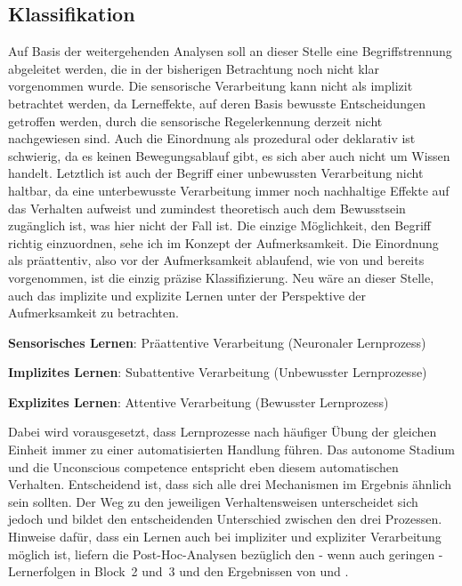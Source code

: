 \documentclass[doc,a4paper,12pt]{apa6}
\begin{document}
\subsection{Klassifikation}

Auf Basis der weitergehenden Analysen soll an dieser Stelle eine Begriffstrennung abgeleitet werden, die in der bisherigen Betrachtung noch nicht klar vorgenommen wurde. Die sensorische Verarbeitung kann nicht als implizit betrachtet werden, da Lerneffekte, auf deren Basis bewusste Entscheidungen getroffen werden, durch die sensorische Regelerkennung derzeit nicht nachgewiesen sind. Auch die Einordnung als prozedural oder deklarativ ist schwierig, da es keinen Bewegungsablauf gibt, es sich aber auch nicht um Wissen handelt. Letztlich ist auch der Begriff einer unbewussten Verarbeitung nicht haltbar, da eine unterbewusste Verarbeitung immer noch nachhaltige Effekte auf das Verhalten aufweist und zumindest theoretisch auch dem Bewusstsein zugänglich ist, was hier nicht der Fall ist. Die einzige Möglichkeit, den Begriff richtig einzuordnen, sehe ich im Konzept der Aufmerksamkeit. Die Einordnung als präattentiv, also vor der Aufmerksamkeit ablaufend, wie von \textcite{paavilainen2007preattentive} und \textcite{bendixen2008rapid} bereits vorgenommen, ist die einzig präzise Klassifizierung. Neu wäre an dieser Stelle, auch das implizite und explizite Lernen unter der Perspektive der Aufmerksamkeit zu betrachten.

\begin{compactitem}
  \item \textbf{Sensorisches Lernen}: Präattentive Verarbeitung (Neuronaler Lernprozess)
  \item \textbf{Implizites Lernen}: Subattentive Verarbeitung (Unbewusster Lernprozesse)
  \item \textbf{Explizites Lernen}: Attentive Verarbeitung (Bewusster Lernprozess)
\end{compactitem}

Dabei wird vorausgesetzt, dass Lernprozesse nach häufiger Übung der gleichen Einheit immer zu einer automatisierten Handlung führen. Das autonome Stadium und die Unconscious competence entspricht eben diesem automatischen Verhalten. Entscheidend ist, dass sich alle drei Mechanismen im Ergebnis ähnlich sein sollten. Der Weg zu den jeweiligen Verhaltensweisen unterscheidet sich jedoch und bildet den entscheidenden Unterschied zwischen den drei Prozessen. Hinweise dafür, dass ein Lernen auch bei impliziter und expliziter Verarbeitung möglich ist, liefern die Post-Hoc-Analysen bezüglich den - wenn auch geringen - Lernerfolgen in Block~2 und~3 und den Ergebnissen von \textcite{paavilainen2007preattentive} und \textcite{bendixen2008rapid}.
\end{document}
